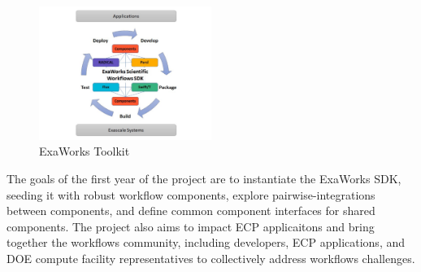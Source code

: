 \begin{figure}
\begin{center}
    \includegraphics[width=0.5\textwidth]{projects/2.3.5-Ecosystem/2.3.5.10-ExaWorks/ExaWorks_Circle.pdf}
  \end{center}
  \vspace{-0.25in}
  \caption{ExaWorks Toolkit\label{fig:arch}}
\end{figure} 

The goals of the first year of the project are to instantiate the ExaWorks SDK, seeding it with
robust workflow components, explore pairwise-integrations between components, and define
common component interfaces for shared components.  The project also aims to impact ECP applicaitons and 
bring together the workflows community, including developers, ECP applications, and DOE compute facility representatives
to collectively address workflows challenges.

